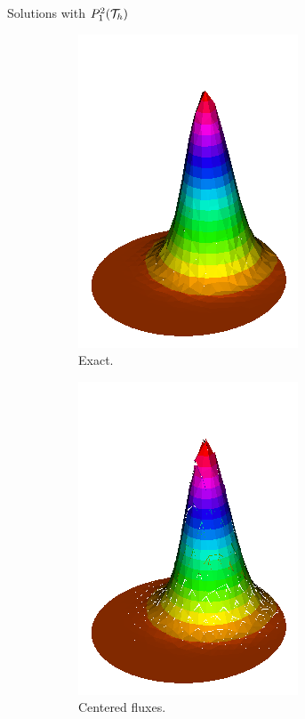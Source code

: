 \begin{frame}{Solutions with $\relax{P}_1^2(\mathcal{T}_h)$}
\begin{figure}[h!]
\begin{subfigure}[b]{0.27\textwidth}
				\includegraphics[scale=0.2]{img/Conveccion_Reaccion/Recortes/steady_convect_react_exact_n_64.png}
				\caption{Exact.}
			\end{subfigure}
			\begin{subfigure}[b]{0.27\textwidth}
				\centering
				\includegraphics[scale=0.2]{img/Conveccion_Reaccion/Recortes/steady_convect_react_approx_CF_n_64.png}
				\caption{Centered fluxes.}
			\end{subfigure}
			\begin{subfigure}[b]{0.27\textwidth}
				\centering

\end{subfigure}
\end{figure}
\end{frame}
